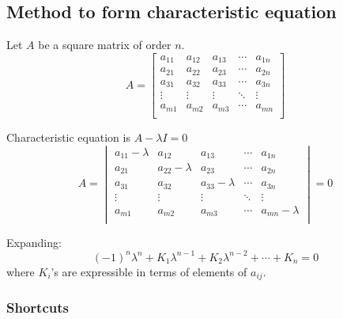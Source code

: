 \documentclass[english,course,fleqn]{lecture}
\begin{document}
  \subsection{Method to form characteristic equation}


  Let $A$ be a square matrix of order $n$.
  \[
    A = \begin{bmatrix}
      a_{11} & a_{12} & a_{13} & \cdots & a_{1n} \\
      a_{21} & a_{22} & a_{23} & \cdots & a_{2n} \\
      a_{31} & a_{32} & a_{33} & \cdots & a_{3n} \\
      \vdots & \vdots & \vdots & \ddots & \vdots \\
      a_{m1} & a_{m2} & a_{m3} & \cdots & a_{mn} \\
    \end{bmatrix}
  \]

  Characteristic equation is $A - \lambda I = 0$
  \[
    A = \begin{vmatrix}
      a_{11} - \lambda & a_{12} & a_{13} & \cdots & a_{1n} \\
      a_{21} & a_{22} - \lambda & a_{23} & \cdots & a_{2n} \\
      a_{31} & a_{32} & a_{33} - \lambda & \cdots & a_{3n} \\
      \vdots & \vdots & \vdots & \ddots & \vdots \\
      a_{m1} & a_{m2} & a_{m3} & \cdots & a_{mn} - \lambda \\
    \end{vmatrix} = 0
  \]

  Expanding: \[
    (-1)^{n} \lambda^{n} + K_{1}\lambda^{n-1} + K_{2}\lambda^{n-2} + \cdots + K_{n} = 0
  \]
  where $K_{i}$'s are expressible in terms of elements of $a_{ij}$.

  \subsubsection*{Shortcuts}
\end{document}
